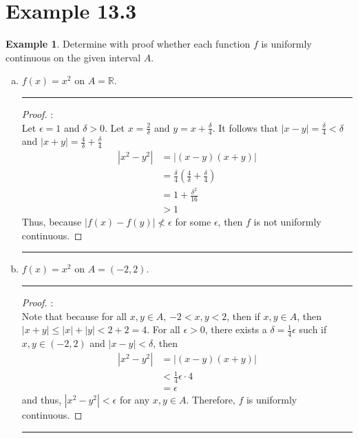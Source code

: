 \documentclass[openany, amssymb, psamsfonts]{amsart}
\newcommand{\bbR}{\mathbb{R}}
\theoremstyle{definition}
\newtheorem{exmp}{Example}[section]
\numberwithin{equation}{section}
\begin{document}
\section*{Example 13.3}
\begin{exmp} 
\label{13.3}
	Determine with proof whether each function $f$ is uniformly continuous on the given interval $A$.
	\begin{enumerate}[(a)]
		\item $f(x) = x^2$ on $A = \bbR$.
\vspace{4pt}     \hrule   \vspace{4pt} \begin{proof}:\\
Let $\epsilon=1$ and $\delta>0$. Let $x = \frac{2}{\delta}$ and $y = x + \frac{\delta}{4}$. It follows that $|x-y| = \frac{\delta}{4}<\delta$ and $|x+y| =  \frac{4}{\delta} + \frac{\delta}{4}$
\begin{align*}
|x^2 - y^2|&=|(x-y)(x+y)| \\
            &= \frac{\delta}{4} (\frac{4}{\delta} + \frac{\delta}{4})\\
            &= 1+ \frac{\delta^2}{16}\\
            &> 1
\end{align*}
Thus, because $|f(x) - f(y)| \not< \epsilon$ for some $\epsilon$, then $f$ is not uniformly continuous. 
\end{proof} \vspace{4pt}     \hrule   \vspace{4pt}
		\item $f(x) = x^2$ on $A = (-2, 2)$.
\vspace{4pt}     \hrule   \vspace{4pt} \begin{proof}:\\ Note that because for all $x,y\in A$, $-2<x,y<2$, then if $x,y \in A$, then $|x+y|\leq |x| + |y|< 2+ 2=4$.
For all $\epsilon>0$, there exists a $\delta = \frac{1}{4}\epsilon$ such if $x,y \in (-2,2)$ and $|x-y|<\delta$, then 
\begin{align*}
|x^2 - y^2|&=|(x-y)(x+y)| \\
            &<\frac{1}{4}\epsilon \cdot 4\\
            &= \epsilon
\end{align*}
and thus, $|x^2 - y^2|< \epsilon$ for any $x,y \in A$. Therefore, $f$ is uniformly continuous.
\end{proof} \vspace{4pt}     \hrule   \vspace{4pt}

\end{enumerate}
\end{exmp}
\end{document}
